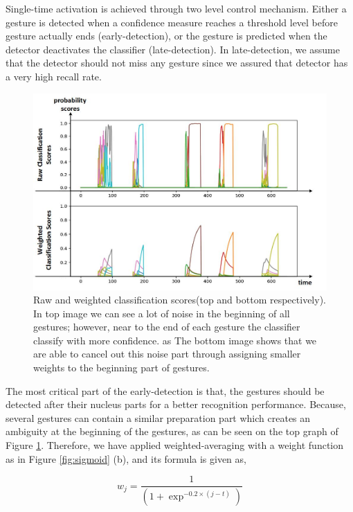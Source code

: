 Single-time activation is achieved through two level control mechanism. Either a gesture is detected when a confidence measure reaches a threshold level before gesture actually ends (early-detection), or the gesture is predicted when the detector deactivates the classifier (late-detection). In late-detection, we assume that the detector should not miss any gesture since we assured that detector has a very high recall rate. \\
\begin{figure}[t!]
	\centering
	\includegraphics[width=\textwidth]{figures/weight_effect.jpg}
	\caption{Raw and weighted classification scores(top and bottom respectively). In top image we can see a lot of noise in the beginning of all gestures; however, near to the end of each gesture the classifier classify with more confidence. as The bottom image shows that we are able to cancel out this noise part through assigning smaller weights to the beginning part of gestures.}
	\label{fig:weight}
\end{figure}

The most critical part of the early-detection is that, the gestures should be detected after their nucleus parts for a better recognition performance. Because, several gestures can contain a similar preparation part which creates an ambiguity at the beginning of the gestures, as can be seen on the top graph of Figure \ref{fig:weight}. Therefore, we have applied weighted-averaging with a weight function as in Figure \ref{fig:sigmoid} (b), and its formula is given as,

\begin{equation}
    \label{eq:weight}
    w_j = \frac{1}{(1+\exp^{-0.2\times(j-t)})}
\end{equation}
    
